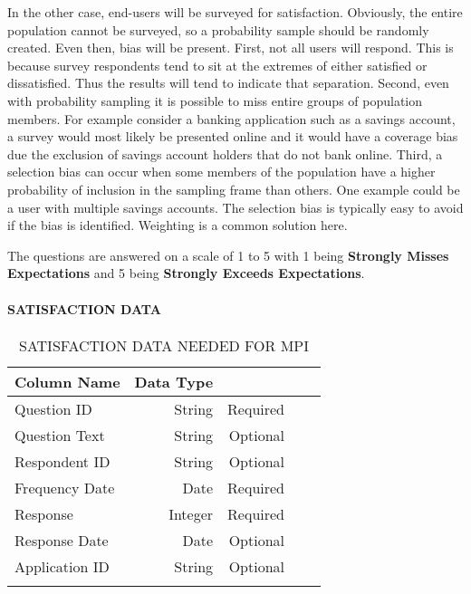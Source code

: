 \documentclass[SDSUThesis.tex]{subfiles}
\begin{document}
       In the other case, end-users will be surveyed for satisfaction. Obviously, the entire population cannot be surveyed, so a probability sample should be randomly created. Even then, bias will be present.  First, not all users will respond.  This is because survey respondents tend to sit at the extremes of either satisfied or dissatisfied.  Thus the results will tend to indicate that separation. Second, even with probability  sampling it is possible to miss entire groups of population members. For example consider a banking application such as a savings account, a survey would most likely be presented online and it would have a coverage bias due the exclusion of savings account holders that do not bank online.  Third, a selection bias can occur when some members of the population have a higher probability of inclusion in the sampling frame than others.  One example could be a user with multiple savings accounts.  The selection bias is typically easy to avoid if the bias is identified.  Weighting is a common solution here. 
                
           
            The questions  are answered on a scale of 1 to 5 with 1 being 
            \textbf{Strongly Misses Expectations} and 5 being \textbf{Strongly Exceeds
            Expectations}.  
            
            \paragraph{SATISFACTION DATA}
                \begin{longtable}{@{}l rr rr}
                    \toprule%
                     \centering%
                     {\bfseries Column Name}
                     & {\bfseries Data Type}
                     &  \\
                    
                    \cmidrule[0.4pt](r{0.125em}){1-1}%
                    \cmidrule[0.4pt](lr{0.125em}){2-2}%
                    \cmidrule[0.4pt](l{0.125em}){3-3}%
                    \endhead
                    
                    Question ID & String  & Required \\
                    \myrowcolour%
                    Question Text & String  & Optional \\
                    Respondent ID & String & Optional \\
                    \myrowcolour%
                    Frequency Date & Date & Required \\
                    Response & Integer & Required \\
                    \myrowcolour%
                    Response Date & Date & Optional \\
                    Application ID & String & Optional \\
                    
                    \bottomrule
                    
                    \caption{SATISFACTION DATA NEEDED FOR MPI}
                    \label{tab:satisfaction}
                \end{longtable}
            
\end{document}
